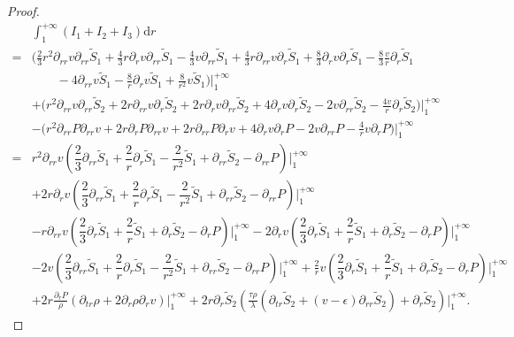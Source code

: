 \documentclass[10pt,reqno]{amsart}
\numberwithin{equation}{section}
\begin{document}
\begin{proof}
			\begin{align*}
				&\int_{1}^{+\infty}(I_1+I_2+I_3)\mathrm{d}r\\
				=&\bigg(\frac{2}{3}r^2\partial_{rr}v\partial_{rr}\tilde{S}_1
				+\frac{4}{3}r\partial_{r}v\partial_{rr}\tilde{S}_1
				-\frac{4}{3}v\partial_{rr}\tilde{S}_1
				+\frac{4}{3}r\partial_{rr}v\partial_{r}\tilde{S}_1
				+\frac{8}{3}\partial_{r}v\partial_{r}\tilde{S}_1
				-\frac{8}{3}\frac{v}{r}\partial_{r}\tilde{S}_1\\
				&\qquad
				-4\partial_{rr}v\tilde{S}_1-\frac{8}{r}\partial_{r}v\tilde{S}_1
				+\frac{8}{r^2}v\tilde{S}_1\bigg)\bigg|_{1}^{+\infty}\\
				&+
				\bigg(r^2\partial_{rr}v\partial_{rr}\tilde{S}_2+2r\partial_{rr}v\partial_{r}\tilde{S}_2+2r\partial_{r}v\partial_{rr}\tilde{S}_2+4\partial_{r}v\partial_{r}\tilde{S}_2-2v\partial_{rr}\tilde{S}_2-\frac{4v}{r}\partial_{r}\tilde{S}_2\bigg)\bigg|_{1}^{+\infty}\\
				&-\bigg(r^2\partial_{rr}P\partial_{rr}v +2r\partial_{r}P\partial_{rr}v+2r\partial_{rr}P\partial_{r}v+
				4\partial_{r}v\partial_{r}P
				-2v\partial_{rr}P-\frac{4}{r}v\partial_{r}P\bigg)\bigg|_{1}^{+\infty}\\
				=&r^2\partial_{rr}v\left(\dfrac{2}{3}\partial_{rr} \tilde{S}_1+\dfrac{2}{r} \partial_r \tilde{S}_1-\dfrac{2}{r^2}\tilde{S}_1+\partial_{rr} \tilde{S}_2-\partial_{rr}P\right)\bigg|_{1}^{+\infty}\\
				&+2r\partial_{r}v\left(\dfrac{2}{3}\partial_{rr} \tilde{S}_1+\dfrac{2}{r} \partial_r \tilde{S}_1-\dfrac{2}{r^2}\tilde{S}_1+\partial_{rr} \tilde{S}_2-\partial_{rr}P\right)\bigg|_{1}^{+\infty}\\
				&-r\partial_{rr}v\left(\dfrac{2}{3}\partial_r \tilde{S}_1+\dfrac{2}{r} \tilde{S}_1+\partial_r \tilde{S}_2-\partial_{r}P\right)\bigg|_{1}^{+\infty}
				-2\partial_{r}v\left(\dfrac{2}{3}\partial_r \tilde{S}_1+\dfrac{2}{r} \tilde{S}_1+\partial_r \tilde{S}_2-\partial_{r}P\right)\bigg|_{1}^{+\infty}\\
				&-2v\left(\dfrac{2}{3}\partial_{rr} \tilde{S}_1+\dfrac{2}{r} \partial_r \tilde{S}_1-\dfrac{2}{r^2}\tilde{S}_1+\partial_{rr} \tilde{S}_2-\partial_{rr}P\right)\bigg|_{1}^{+\infty}
				+\frac{2}{r}v\left(\dfrac{2}{3}\partial_r \tilde{S}_1+\dfrac{2}{r} \tilde{S}_1+\partial_r \tilde{S}_2-\partial_{r}P\right)\bigg|_{1}^{+\infty}\\
				&+2r\frac{\partial_{r}P}{\rho}(\partial_{tr}\rho+2\partial_{r}\rho\partial_{r}v)\bigg|_{1}^{+\infty}
				+2r\partial_{r}\tilde{S}_2\left(\frac{\tau\rho}{\lambda}\left(\partial_{tr} \tilde{S}_2+(v-\epsilon)\partial_{rr} \tilde{S}_2\right)+\partial_{r} \tilde{S}_2\right)\bigg|_{1}^{+\infty}.
			\end{align*}


\end{proof}
\end{document}
